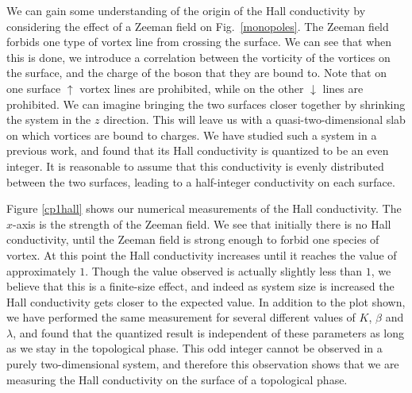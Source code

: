 \documentclass[prb,twocolumn]{revtex4-1}
\begin{document}
We can gain some understanding of the origin of the Hall conductivity by considering the effect of a Zeeman field on Fig.~\ref{monopoles}. The Zeeman field forbids one type of vortex line from crossing the surface. We can see that when this is done, we introduce a correlation between the vorticity of the vortices on the surface, and the charge of the boson that they are bound to. Note that on one surface $\uparrow$ vortex lines are prohibited, while on the other $\downarrow$ lines are prohibited. We can imagine bringing the two surfaces closer together by shrinking the system in the $z$ direction. This will leave us with a quasi-two-dimensional slab on which vortices are bound to charges. We have studied such a system in a previous work,\cite{FQHE} and found that its Hall conductivity is quantized to be an even integer. It is reasonable to assume that this conductivity is evenly distributed between the two surfaces, leading to a half-integer conductivity on each surface. 

Figure \ref{cp1hall} shows our numerical measurements of the Hall conductivity. The $x$-axis is the strength of the Zeeman field. We see that initially there is no Hall conductivity, until the Zeeman field is strong enough to forbid one species of vortex. At this point the Hall conductivity increases until it reaches the value of approximately $1$. Though the value observed is actually slightly less than $1$, we believe that this is a finite-size effect, and indeed as system size is increased the Hall conductivity gets closer to the expected value. In addition to the plot shown, we have performed the same measurement for several different values of $K$, $\beta$ and $\lambda$, and found that the quantized result is independent of these parameters as long as we stay in the topological phase. This odd integer cannot be observed in a purely two-dimensional system, and therefore this observation shows that we are measuring the Hall conductivity on the surface of a topological phase.
\end{document}
